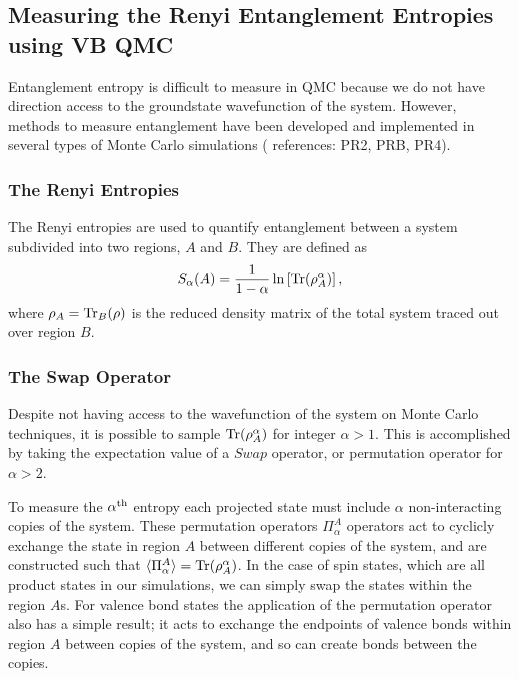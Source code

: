\documentclass[prb,aps,twocolumn,floatfix,amsmath,amssymb,superscriptaddress,tightenlines]{revtex4}
\begin{document}
\subsection{Measuring the Renyi Entanglement Entropies using VB QMC}
Entanglement entropy is difficult to measure in QMC because we do not have direction access to the groundstate wavefunction of the system.
However, methods to measure entanglement have been developed and implemented in {\color{red} several} types of Monte Carlo simulations ({\color{red} references: PR2, PRB, PR4}).

\subsubsection{The Renyi Entropies}
The Renyi entropies are used to quantify entanglement between a system subdivided into two regions, $A$ and $B$.
They are defined as 
\begin{equation} \label{renyi}
S_{\alpha}(A) = \frac{1}{1-\alpha}\ln \left[ {\rm Tr}(\rho_A^{\alpha}) \right],
\end{equation}
where $\rho_A = {\rm Tr}_B (\rho)$ is the reduced density matrix of the total system traced out over region $B$.\\

\subsubsection{The Swap Operator}
Despite not having access to the wavefunction of the system on Monte Carlo techniques, it is possible to sample ${\rm Tr}(\rho_A^{\alpha})$ for integer $\alpha > 1$.
This is accomplished by taking the expectation value of a $Swap$ operator, %
or permutation operator for $\alpha > 2$.%


To measure the $\alpha^{\rm th}$ entropy each projected state must include $\alpha$ non-interacting copies of the system.
These permutation operators $\Pi_\alpha^A$ operators act to cyclicly exchange the state in region $A$ between different copies of the system, and are constructed such that  $\langle \Pi_\alpha^A \rangle = {\rm Tr}(\rho_A^{\alpha})$.
In the case of spin states, which are all product states in our simulations, we can simply swap the states within the region $A$s.  
For valence bond states the application of the permutation operator also has a simple result; it acts to exchange the endpoints of valence bonds within region $A$ between copies of the system, and so can create bonds between the copies.
\end{document}
